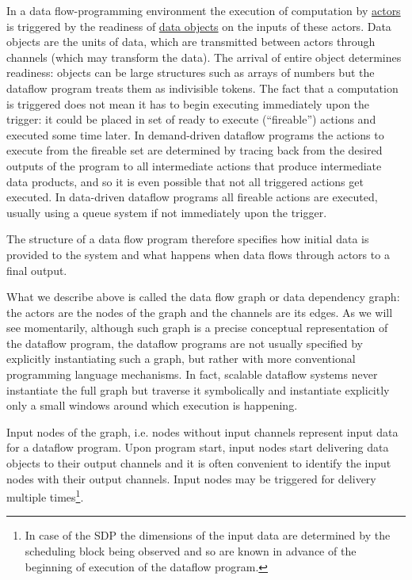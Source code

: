 \documentclass[11pt,a4paper]{article}
\begin{document}
In a data flow-programming environment the execution of computation by
\underline{actors} is triggered by the readiness of \underline{data
  objects} on the inputs of these actors.  Data objects are the units
of data, which are transmitted between actors through channels (which
may transform the data). The arrival of entire object determines
readiness: objects can be large structures such as arrays of numbers
but the dataflow program treats them as indivisible tokens.  The fact
that a computation is triggered does not mean it has to begin
executing immediately upon the trigger: it could be placed in set of
ready to execute (“fireable”) actions and executed some time later. In
demand-driven dataflow programs the actions to execute from the
fireable set are determined by tracing back from the desired outputs
of the program to all intermediate actions that produce intermediate
data products, and so it is even possible that not all triggered
actions get executed. In data-driven dataflow programs all fireable
actions are executed, usually using a queue system if not immediately
upon the trigger.


The structure of a data flow program therefore specifies how initial
data is provided to the system and what happens when data flows
through actors to a final output.


What we describe above is called the data flow graph or data
dependency graph: the actors are the nodes of the graph and the
channels are its edges. As we will see momentarily, although such
graph is a precise conceptual representation of the dataflow program,
the dataflow programs are not usually specified by explicitly
instantiating such a graph, but rather with more conventional
programming language mechanisms. In fact, scalable dataflow
\citep{Bosilca6008964,Wozniak:2012:TDD:2443416.2443421} systems never
instantiate the full graph but traverse it symbolically and
instantiate explicitly only a small windows around which execution is
happening.

Input nodes of the graph, i.e. nodes without input channels represent
input data for a dataflow program.  Upon program start, input nodes
start delivering data objects to their output channels and it is often
convenient to identify the input nodes with their output
channels. Input nodes may be triggered for delivery multiple
times\footnote{In case of the SDP the dimensions of the input data are
  determined by the scheduling block being observed and so are known
  in advance of the beginning of execution of the dataflow program.}.
\end{document}
